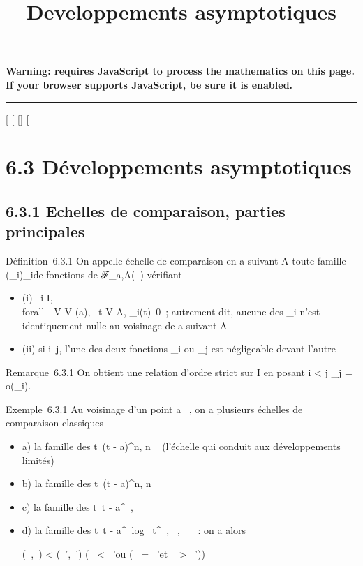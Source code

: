 \documentclass[]{article}
\title{Developpements asymptotiques}
\author{}
\date{}
\begin{document}
\maketitle

\textbf{Warning: 
requires JavaScript to process the mathematics on this page.\\ If your
browser supports JavaScript, be sure it is enabled.}

\begin{center}\rule{3in}{0.4pt}\end{center}

[
[
[]
[

\section{6.3 Développements asymptotiques}

\subsection{6.3.1 Echelles de comparaison, parties principales}

Définition~6.3.1 On appelle échelle de comparaison en a suivant A toute
famille (\phi_i)_i\inI de fonctions de ℱ_a,A(~)
vérifiant

\begin{itemize}
\itemsep1pt\parskip0pt
\item
  (i) \forall~i \in I, \\forall~~V \in V
  (a), \exists~t \in V \bigcap A,
  \phi_i(t)\neq~0~; autrement dit, aucune
  des \phi_i n'est identiquement nulle au voisinage de a suivant A
\item
  (ii) si i\neq~j, l'une des deux fonctions
  \phi_i ou \phi_j est négligeable devant l'autre
\end{itemize}

Remarque~6.3.1 On obtient une relation d'ordre strict sur I en posant i
< j \Leftrightarrow \phi_j =
o(\phi_i).

Exemple~6.3.1 Au voisinage d'un point a \in {}~, on a plusieurs échelles de
comparaison classiques

\begin{itemize}
\item
  a) la famille des t\mapsto~(t - a)^n, n
  \in {}~ (l'échelle qui conduit aux développements limités)
\item
  b) la famille des t\mapsto~(t - a)^n, n
  \in {}
\item
  c) la famille des t\mapsto~t -
  a^\alpha~, \alpha~ \in {}~
\item
  d) la famille des t\mapsto~t -
  a^\alpha~log~
  t^\beta~, \alpha~,\beta~ \in {}~~: on a alors

  (\alpha~,\beta~) < (\alpha~',\beta~') \Leftrightarrow
  \bigl (\alpha~ < \alpha~'\text ou (\alpha~
  = \alpha~'\text et \beta~ >
  \beta~')\bigr )
\end{itemize}
\end{document}
